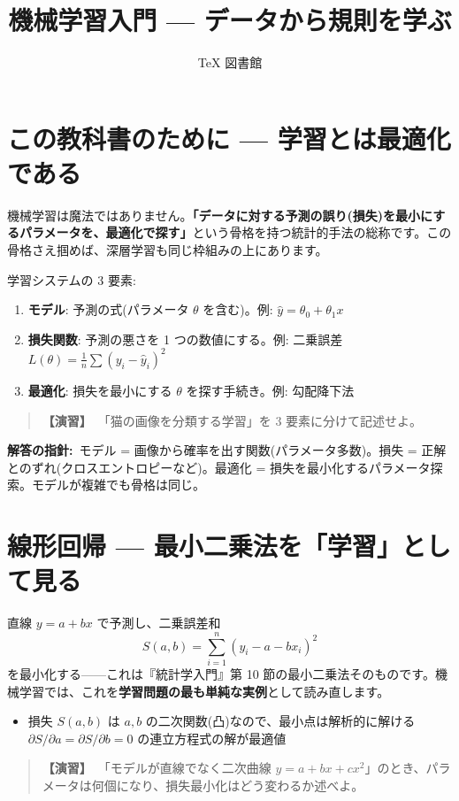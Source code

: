 \documentclass{article}
\title{機械学習入門 — データから規則を学ぶ}
\author{TeX 図書館}
\begin{document}
\section{この教科書のために — 学習とは最適化である}

機械学習は魔法ではありません。\textbf{「データに対する予測の誤り(損失)を最小にするパラメータを、最適化で探す」}という骨格を持つ統計的手法の総称です。この骨格さえ掴めば、深層学習も同じ枠組みの上にあります。

学習システムの 3 要素:
\begin{enumerate}
\item \textbf{モデル}: 予測の式(パラメータ \(\theta\) を含む)。例: \(\hat{y} = \theta_0 + \theta_1 x\)
\item \textbf{損失関数}: 予測の悪さを 1 つの数値にする。例: 二乗誤差 \(L(\theta) = \frac{1}{n}\sum (y_i - \hat{y}_i)^2\)
\item \textbf{最適化}: 損失を最小にする \(\theta\) を探す手続き。例: 勾配降下法
\end{enumerate}

\begin{quote}
\textbf{【演習】}\ 「猫の画像を分類する学習」を 3 要素に分けて記述せよ。
\end{quote}

\textbf{解答の指針:}\ モデル = 画像から確率を出す関数(パラメータ多数)。損失 = 正解とのずれ(クロスエントロピーなど)。最適化 = 損失を最小化するパラメータ探索。モデルが複雑でも骨格は同じ。

\section{線形回帰 — 最小二乗法を「学習」として見る}

直線 \(y = a + bx\) で予測し、二乗誤差和
\[ S(a, b) = \sum_{i=1}^n (y_i - a - bx_i)^2 \]
を最小化する——これは『統計学入門』第 10 節の最小二乗法そのものです。機械学習では、これを\textbf{学習問題の最も単純な実例}として読み直します。

\begin{itemize}
\item 損失 \(S(a,b)\) は \(a, b\) の二次関数(凸)なので、最小点は解析的に解ける
\(\partial S/\partial a = \partial S/\partial b = 0\) の連立方程式の解が最適値
\end{itemize}

\begin{quote}
\textbf{【演習】}\ 「モデルが直線でなく二次曲線 \(y = a + bx + cx^2\)」のとき、パラメータは何個になり、損失最小化はどう変わるか述べよ。
\end{quote}
\end{document}

